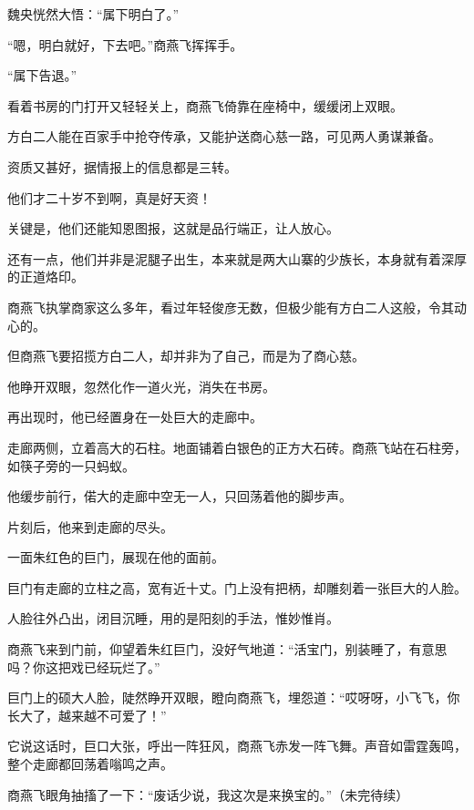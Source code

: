 \begin{this_body}
魏央恍然大悟：“属下明白了。”

“嗯，明白就好，下去吧。”商燕飞挥挥手。

“属下告退。”

看着书房的门打开又轻轻关上，商燕飞倚靠在座椅中，缓缓闭上双眼。

方白二人能在百家手中抢夺传承，又能护送商心慈一路，可见两人勇谋兼备。

资质又甚好，据情报上的信息都是三转。

他们才二十岁不到啊，真是好天资！

关键是，他们还能知恩图报，这就是品行端正，让人放心。

还有一点，他们并非是泥腿子出生，本来就是两大山寨的少族长，本身就有着深厚的正道烙印。

商燕飞执掌商家这么多年，看过年轻俊彦无数，但极少能有方白二人这般，令其动心的。

但商燕飞要招揽方白二人，却并非为了自己，而是为了商心慈。

他睁开双眼，忽然化作一道火光，消失在书房。

再出现时，他已经置身在一处巨大的走廊中。

走廊两侧，立着高大的石柱。地面铺着白银色的正方大石砖。商燕飞站在石柱旁，如筷子旁的一只蚂蚁。

他缓步前行，偌大的走廊中空无一人，只回荡着他的脚步声。

片刻后，他来到走廊的尽头。

一面朱红色的巨门，展现在他的面前。

巨门有走廊的立柱之高，宽有近十丈。门上没有把柄，却雕刻着一张巨大的人脸。

人脸往外凸出，闭目沉睡，用的是阳刻的手法，惟妙惟肖。

商燕飞来到门前，仰望着朱红巨门，没好气地道：“活宝门，别装睡了，有意思吗？你这把戏已经玩烂了。”

巨门上的硕大人脸，陡然睁开双眼，瞪向商燕飞，埋怨道：“哎呀呀，小飞飞，你长大了，越来越不可爱了！”

它说这话时，巨口大张，呼出一阵狂风，商燕飞赤发一阵飞舞。声音如雷霆轰鸣，整个走廊都回荡着嗡鸣之声。

商燕飞眼角抽搐了一下：“废话少说，我这次是来换宝的。”（未完待续）

\end{this_body}

